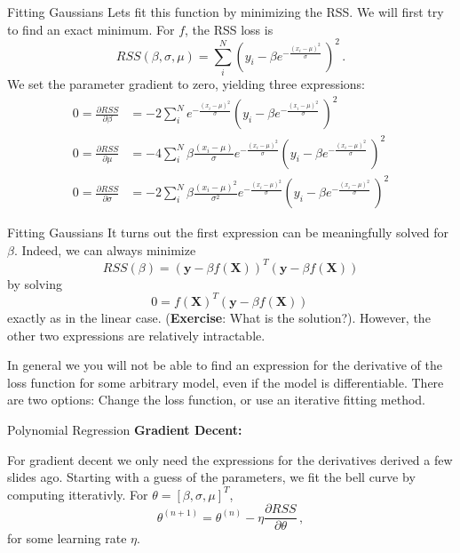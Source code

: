 \documentclass[10pt, table, dvipsnames,xcdraw, handout]{beamer}
\begin{document}
\begin{frame}[fragile]{Fitting Gaussians}
Lets fit this function by minimizing the RSS. We will first try to find an exact minimum. For $f$, the RSS loss is
$$
RSS(\beta,\sigma, \mu) = \sum_{i}^N\left(y_i- \beta e^{-\frac{(x_i-\mu)^2}{\sigma}} \,\right)^2\,.
$$ 
We set the parameter gradient to zero, yielding three expressions:
\begin{align*}
0=\frac{\partial RSS}{\partial \beta} &= -2 \sum_{i}^N   e^{-\frac{(x_i-\mu)^2}{\sigma} }\left(y_i- \beta e^{-\frac{(x_i-\mu)^2}{\sigma} }\,\right)^2
\\
0=\frac{\partial RSS}{\partial \mu} &= -4 \sum_{i}^N\beta \frac{(x_i-\mu)}{\sigma}   e^{-\frac{(x_i-\mu)^2}{\sigma} }\left(y_i- \beta e^{-\frac{(x_i-\mu)^2}{\sigma} }\,\right)^2
\\
0=\frac{\partial RSS}{\partial \sigma} &= -2 \sum_{i}^N \beta \frac{(x_i-\mu)^2}{\sigma^2}   e^{-\frac{(x_i-\mu)^2}{\sigma} }\left(y_i- \beta e^{-\frac{(x_i-\mu)^2}{\sigma} }\,\right)^2
\end{align*}
\end{frame}


\begin{frame}[fragile]{Fitting Gaussians}
It turns out the first expression can be meaningfully solved for $\beta$. Indeed, we can always minimize 
$$
RSS(\beta) = (\mathbf{y}-\beta f(\mathbf{X}))^T(\mathbf{y}-\beta f(\mathbf{X}))
$$
by solving 
$$
0 =  f(\mathbf{X})^T(\mathbf{y}-\beta f(\mathbf{X}))\,
$$
exactly as in the linear case. (\textbf{Exercise}: What is the solution?). However, the other two expressions are relatively intractable. 

In general we you will not be able to find an expression for the derivative of the loss function for some arbitrary model, even if the model is differentiable. There are two options: Change the loss function, or use an iterative fitting method. 
\end{frame}




\begin{frame}[fragile]{Polynomial Regression}
\textbf{Gradient Decent:}

For gradient decent we only need the expressions for the derivatives derived a few slides ago. Starting with a guess of the parameters, we fit the bell curve by computing itterativly. For $\theta = [\beta, \sigma, \mu]^T$, 
$$
\theta^{(n+1)} = \theta^{(n)} - \eta \frac{\partial RSS}{\partial \theta}\,,
$$
for some learning rate $\eta$. 
\end{frame}
\end{document}
